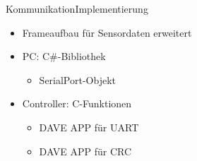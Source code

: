\begin{frame}{Kommunikation}{Implementierung}
  \begin{itemize}
    \item Frameaufbau f\"ur Sensordaten erweitert
  \end{itemize}
  \begin{itemize}
    \item PC: C\#-Bibliothek
    \begin{itemize}
    \item SerialPort-Objekt
    \end{itemize}
    \item Controller: C-Funktionen
    \begin{itemize}
      \item DAVE APP f\"ur UART
      \item DAVE APP f\"ur CRC
    \end{itemize}
  \end{itemize}
\end{frame}
